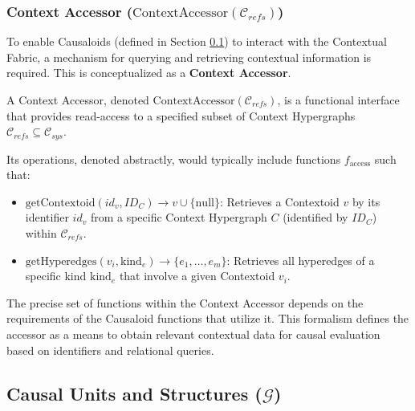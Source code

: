     \subsubsection[Context Accessor (ContextAccessor C\_refs)]{Context Accessor (\(\text{ContextAccessor}(\mathcal{C}_{refs})\))}
    \label{ssec:context_accessor_formal}

    To enable Causaloids (defined in Section \ref{sec:formalization_causal_units}) to interact with the Contextual Fabric, a mechanism for querying and retrieving contextual information is required. This is conceptualized as a \textbf{Context Accessor}.

    \begin{definition}
    \label{def:context_accessor}
 	A Context Accessor, denoted \(\text{ContextAccessor}(\mathcal{C}_{refs})\), is a functional interface that provides read-access to a specified subset of Context Hypergraphs \(\mathcal{C}_{refs} \subseteq \mathcal{C}_{sys}\).
    \end{definition}   
   
    Its operations, denoted abstractly, would typically include functions \(f_{\text{access}}\) such that: %
    \begin{itemize} 
        \item \(\text{getContextoid}(id_v, ID_C) \to v \cup \{\text{null}\}\): Retrieves a Contextoid \(v\) by its identifier \(id_v\) from a specific Context Hypergraph \(C\) (identified by \(ID_C\)) within \(\mathcal{C}_{refs}\).
        \item \(\text{getHyperedges}(v_i, \text{kind}_e) \to \{e_1, \dots, e_m\}\): Retrieves all hyperedges of a specific kind \(\text{kind}_e\) that involve a given Contextoid \(v_i\).
    \end{itemize}
    The precise set of functions within the Context Accessor depends on the requirements of the Causaloid functions that utilize it. This formalism defines the accessor as a means to obtain relevant contextual data for causal evaluation based on identifiers and relational queries.


\subsection[Causal Units and Structures (G)]{Causal Units and Structures (\(\mathcal{G}\))} 
\label{sec:formalization_causal_units}

